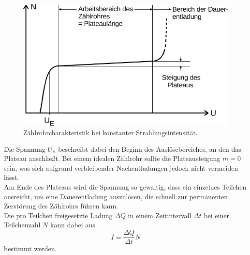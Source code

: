 \begin{figure}[H]
    \centering
    \includegraphics{figures/Abb_4.pdf}
    \caption{Zählrohrcharakteristik bei konstanter Strahlungsintensität\cite{ap03}.}
    \label{fig:abb4}
\end{figure}

Die Spannung $U_{\text{E}}$ beschreibt dabei
den Beginn des Auslösebereiches, an den das
Plateau anschließt.
Bei einem idealen Zählrohr sollte die Plateausteigung
$m = 0$ sein, was sich aufgrund verbleibender Nachentladungen
jedoch nicht vermeiden lässt. \\

Am Ende des Plateaus wird die Spannung so gewaltig,
dass ein einzelnes Teilchen ausreicht, um
eine Dauerentladung auszulösen, die schnell
zur permanenten Zerstörung des Zählrohrs führen kann. \\

Die pro Teilchen freigesetzte Ladung $\Delta Q$ in einem Zeitintervall $\Delta t$ bei einer Teilchenzahl $N$ kann dabei aus
\begin{equation}
    I = \frac{\Delta Q}{\Delta t} N
    \label{eq:teilchenstrom}
\end{equation}
bestimmt werden.



